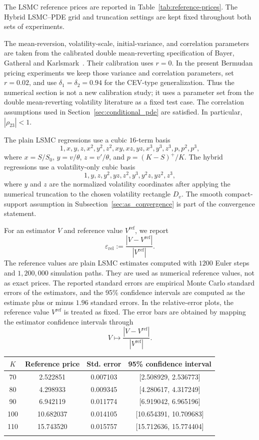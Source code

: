 \documentclass[pdflatex,sn-mathphys-num]{sn-jnl}
\makeatletter
\theoremstyle{thmstyleone}%
\theoremstyle{thmstylethree}%
\theoremstyle{thmstyletwo}%
\renewenvironment{table}[1][]{%
  \par\addvspace{12pt}%
  \noindent\begin{minipage}{\textwidth}%
  \def\@captype{table}%
  \centering%
  \tablebodyfont%
}{%
  \end{minipage}%
  \par\addvspace{12pt}%
}
\makeatother
\begin{document}
The LSMC reference prices are reported in Table~\ref{tab:reference-prices}. The
Hybrid LSMC--PDE grid and truncation settings are kept fixed throughout both
sets of experiments.

The mean-reversion, volatility-scale, initial-variance, and correlation
parameters are taken from the calibrated double mean-reverting specification of
Bayer, Gatheral and Karlsmark~\citep{bayer2013fast}. Their calibration uses
$r=0$. In the present Bermudan pricing experiments we keep those variance and
correlation parameters, set $r=0.02$, and use
$\delta_1=\delta_2=0.94$ for the CEV-type generalization. Thus the numerical
section is not a new calibration study; it uses a parameter set from the double
mean-reverting volatility literature as a fixed test case.
The correlation assumptions used in Section~\ref{sec:conditional_pde} are
satisfied. In particular, $|\rho_{23}|<1$.

The plain LSMC regressions use a cubic $16$-term basis
$$
1,x,y,z,x^2,y^2,z^2,xy,xz,yz,x^3,y^3,z^3,p,p^2,p^3,
$$
where $x=S/S_0$, $y=v/\theta$, $z=v'/\theta$, and
$p=(K-S)^+/K$. The hybrid regressions use a volatility-only cubic basis
$$
1,y,z,y^2,yz,z^2,y^3,y^2z,yz^2,z^3,
$$
where $y$ and $z$ are the normalized volatility coordinates after applying
the numerical truncation to the chosen volatility rectangle $D_v$. The smooth
compact-support assumption in Subsection~\ref{sec:as_convergence} is part of
the convergence statement.

For an estimator $V$ and reference value $V^{\mathrm{ref}}$, we report
$$
\varepsilon_{\mathrm{rel}}
:=
\frac{|V-V^{\mathrm{ref}}|}{|V^{\mathrm{ref}}|}.
$$
The reference values are plain LSMC estimates computed with $1200$
Euler steps and $1{,}200{,}000$ simulation paths. They are used as numerical
reference values, not as exact prices. The reported standard errors are
empirical Monte Carlo standard errors of the estimators, and the
95\% confidence intervals are computed as the estimate plus or minus
$1.96$ standard errors. In the relative-error
plots, the reference value
$V^{\mathrm{ref}}$ is treated as fixed. The error bars are obtained by mapping
the estimator confidence intervals through
$$
V\mapsto \frac{|V-V^{\mathrm{ref}}|}{|V^{\mathrm{ref}}|}.
$$
\begin{table}[htbp]
\centering
\caption{LSMC reference values for the parameter set in Table~\ref{tab:parameter-setup}.}
\label{tab:reference-prices}
\small
\begin{tabularx}{0.82\textwidth}{@{}cccc@{}}
\toprule
$K$ & Reference price & Std. error & 95\% confidence interval \\
\midrule
70 & 2.522851 & 0.007103 & [2.508929, 2.536773] \\
80 & 4.298933 & 0.009345 & [4.280617, 4.317249] \\
90 & 6.942119 & 0.011774 & [6.919042, 6.965196] \\
100 & 10.682037 & 0.014105 & [10.654391, 10.709683] \\
110 & 15.743520 & 0.015757 & [15.712636, 15.774404] \\
\botrule
\end{tabularx}
\end{table}
\end{document}
